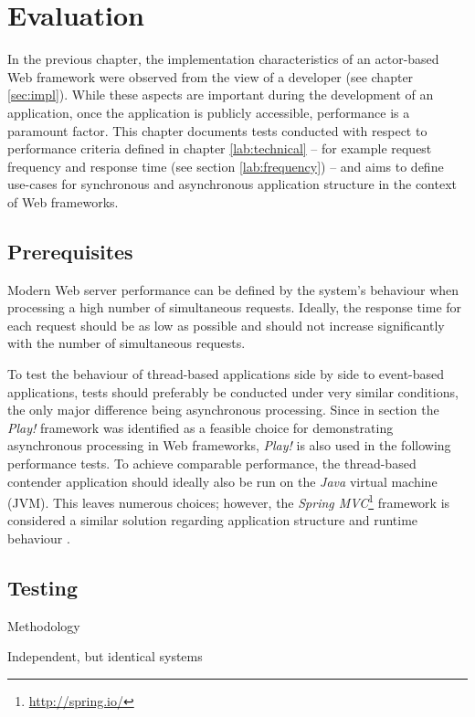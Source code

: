 \chapter{Evaluation}

In the previous chapter, the implementation characteristics of an actor-based Web framework were observed from the view of a developer (see chapter \ref{sec:impl}). While these aspects are important during the development of an application, once the application is publicly accessible, performance is a paramount factor. This chapter documents tests conducted with respect to performance criteria defined in chapter \ref{lab:technical} -- for example request frequency and response time (see section \ref{lab:frequency}) -- and aims to define use-cases for synchronous and asynchronous application structure in the context of Web frameworks.

\section{Prerequisites}

Modern Web server performance can be defined by the system's behaviour when processing a high number of simultaneous requests. Ideally, the response time for each request should be as low as possible and should not increase significantly with the number of simultaneous requests. 

To test the behaviour of thread-based applications side by side to event-based applications, tests should preferably be conducted under very similar conditions, the only major difference being asynchronous processing. Since in section \label{lab:lang} the \textit{Play!} framework was identified  as a feasible choice for demonstrating asynchronous processing in Web frameworks, \textit{Play!} is also used in the following performance tests. To achieve comparable performance, the thread-based contender application should ideally also be run on the \textit{Java} virtual machine (JVM). This leaves numerous choices; however, the \textit{Spring MVC}\footnote{\url{http://spring.io/}} framework is considered a similar solution regarding application structure and runtime behaviour \cite[p. 109]{Scala}.

\section{Testing}

Methodology


Independent, but identical systems

